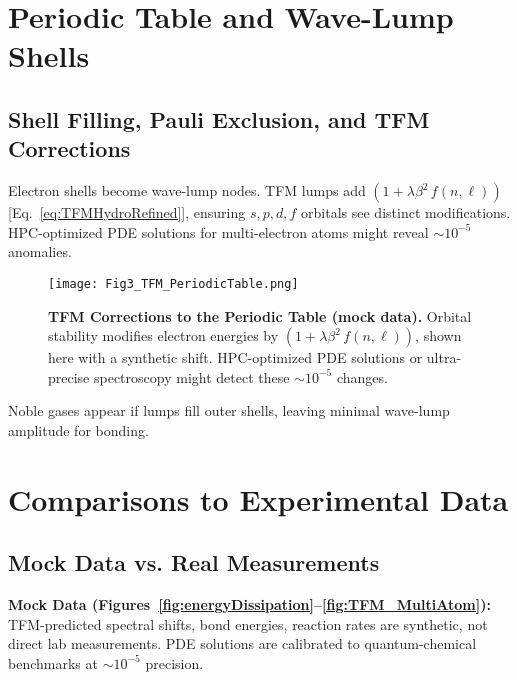 \documentclass[12pt]{article}
\begin{document}
\section{Periodic Table and Wave-Lump Shells}
\label{sec:PeriodicTable}

\subsection{Shell Filling, Pauli Exclusion, and TFM Corrections}
Electron shells become wave-lump nodes. TFM lumps add $(1+\lambda\beta^2\,f(n,\ell))$ [Eq.~\eqref{eq:TFMHydroRefined}], ensuring $s,p,d,f$ orbitals see distinct modifications. HPC-optimized PDE solutions for multi-electron atoms might reveal $\sim10^{-5}$ anomalies.

\begin{figure}[ht]
  \centering
  \texttt{[image: Fig3\_TFM\_PeriodicTable.png]}
  \caption{
    \textbf{TFM Corrections to the Periodic Table (mock data).}  
    Orbital stability modifies electron energies by $(1+\lambda\beta^2\,f(n,\ell))$,
    shown here with a synthetic shift. HPC-optimized PDE solutions or ultra-precise spectroscopy might detect these $\sim10^{-5}$ changes.
  }
  \label{fig:tfmPeriodic}
\end{figure}

Noble gases appear if lumps fill outer shells, leaving minimal wave-lump amplitude for bonding.

\section{Comparisons to Experimental Data}
\label{sec:CompExperiments}

\subsection{Mock Data vs. Real Measurements}
\textbf{Mock Data (Figures~\ref{fig:energyDissipation}--\ref{fig:TFM_MultiAtom}):} TFM-predicted spectral shifts, bond energies, reaction rates are synthetic, not direct lab measurements. PDE solutions are calibrated to quantum-chemical benchmarks at $\sim10^{-5}$ precision.
\end{document}
